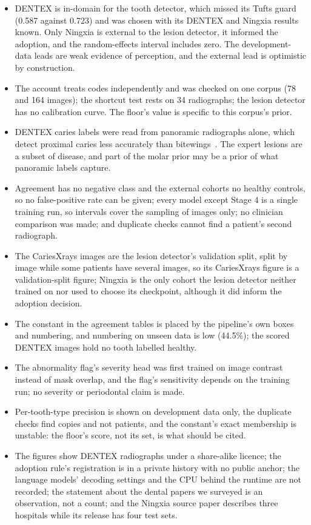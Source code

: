 \documentclass[conference]{IEEEtran}
\begin{document}
\begin{itemize}
\item DENTEX is in-domain for the tooth detector, which missed its Tufts guard (0.587 against 0.723) and was chosen with its DENTEX and Ningxia results known. Only Ningxia is external to the lesion detector, it informed the adoption, and the random-effects interval includes zero. The development-data leads are weak evidence of perception, and the external lead is optimistic by construction.
\item The account treats codes independently and was checked on one corpus (78 and 164 images); the shortcut test rests on 34 radiographs; the lesion detector has no calibration curve. The floor's value is specific to this corpus's prior.
\item DENTEX caries labels were read from panoramic radiographs alone, which detect proximal caries less accurately than bitewings~\cite{akarslan2008comparison}. The expert lesions are a subset of disease, and part of the molar prior may be a prior of what panoramic labels capture.
\item Agreement has no negative class and the external cohorts no healthy controls, so no false-positive rate can be given; every model except Stage 4 is a single training run, so intervals cover the sampling of images only; no clinician comparison was made; and duplicate checks cannot find a patient's second radiograph.
\item The CariesXrays images are the lesion detector's validation split, split by image while some patients have several images, so its CariesXrays figure is a validation-split figure; Ningxia is the only cohort the lesion detector neither trained on nor used to choose its checkpoint, although it did inform the adoption decision.
\item The constant in the agreement tables is placed by the pipeline's own boxes and numbering, and numbering on unseen data is low (44.5\%); the scored DENTEX images hold no tooth labelled healthy.
\item The abnormality flag's severity head was first trained on image contrast instead of mask overlap, and the flag's sensitivity depends on the training run; no severity or periodontal claim is made.
\item Per-tooth-type precision is shown on development data only, the duplicate checks find copies and not patients, and the constant's exact membership is unstable: the floor's score, not its set, is what should be cited.
\item The figures show DENTEX radiographs under a share-alike licence; the adoption rule's registration is in a private history with no public anchor; the language models' decoding settings and the CPU behind the runtime are not recorded; the statement about the dental papers we surveyed is an observation, not a count; and the Ningxia source paper describes three hospitals while its release has four test sets.
\end{itemize}
\end{document}
